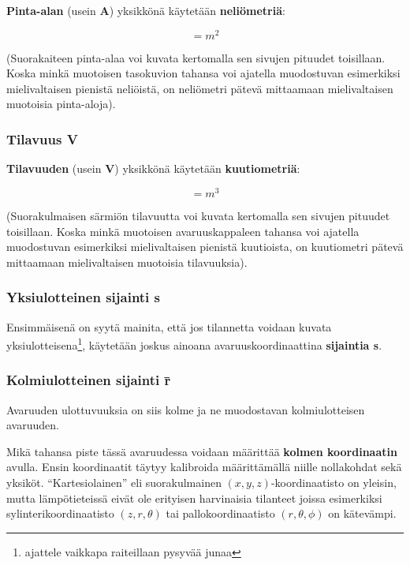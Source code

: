 \documentclass[12pt,a4paper,finnish]{book}
\begin{document}
\textbf{Pinta-alan} (usein \textbf{A}) yksikkönä käytetään \textbf{neliömetriä}:

\begin{equation}
 [A] = m^2
\end{equation}

(Suorakaiteen pinta-alaa voi kuvata kertomalla sen sivujen pituudet toisillaan. Koska minkä muotoisen tasokuvion 
tahansa voi ajatella muodostuvan esimerkiksi mielivaltaisen pienistä neliöistä, on neliömetri pätevä mittaamaan 
mielivaltaisen muotoisia pinta-aloja).

\subsubsection{Tilavuus V}

\textbf{Tilavuuden} (usein \textbf{V}) yksikkönä käytetään \textbf{kuutiometriä}:

\begin{equation}
 [V] = m^3
\end{equation}

(Suorakulmaisen särmiön tilavuutta voi kuvata kertomalla sen sivujen pituudet toisillaan. Koska minkä muotoisen avaruuskappaleen 
tahansa voi ajatella muodostuvan esimerkiksi mielivaltaisen pienistä kuutioista, on kuutiometri pätevä mittaamaan 
mielivaltaisen muotoisia tilavuuksia).

\subsubsection{Yksiulotteinen sijainti s}

Ensimmäisenä on syytä mainita, että jos tilannetta voidaan kuvata yksiulotteisena\footnote{ajattele vaikkapa 
raiteillaan pysyvää junaa}, käytetään joskus ainoana avaruuskoordinaattina \textbf{sijaintia s}.

\subsubsection{Kolmiulotteinen sijainti \={r}}

Avaruuden ulottuvuuksia on siis kolme ja ne muodostavan kolmiulotteisen avaruuden. 

Mikä tahansa piste tässä avaruudessa voidaan määrittää \textbf{kolmen koordinaatin} avulla. 
Ensin koordinaatit täytyy kalibroida määrittämällä niille nollakohdat sekä yksiköt. ``Kartesiolainen'' eli 
suorakulmainen $(x, y, z)$-koordinaatisto on yleisin, mutta lämpötieteissä eivät ole erityisen harvinaisia tilanteet 
joissa esimerkiksi sylinterikoordinaatisto $(z, r, \theta)$ tai pallokoordinaatisto $(r, \theta, \phi)$ on kätevämpi.
\end{document}
